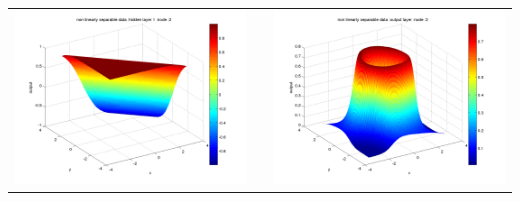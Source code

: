 \documentclass[fleqn]{article}
\begin{document}
\begin{center}
\begin{longtable}{ c | c | r  }
    \includegraphics[scale=0.25]{./pics/nonlinearlyseparable/_4_2/_4_2_epoch_100_hidden layer 1 :2} &  & \includegraphics[scale=0.25]{./pics/nonlinearlyseparable/_4_2/_4_2_epoch_100_output layer :2} \\ 

\end{longtable}
\end{center}
\end{document}
